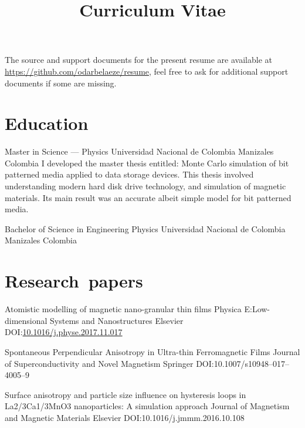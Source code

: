 \documentclass[12pt,english]{moderncv}
\title{Curriculum Vitae}
\begin{document}
\maketitle

\begin{centering}
    The source and support documents for the present resume are available at
    \url{https://github.com/odarbelaeze/resume}, feel free to ask for
    additional support documents if some are missing.
\end{centering}


\section{Education}

        {Master in Science --- Physics}
        {Universidad Nacional de Colombia}
        {Manizales}
        {Colombia}
        {%
            I developed the master thesis entitled: Monte Carlo simulation of
            bit patterned media applied to data storage devices. This thesis
            involved understanding modern hard disk drive technology, and
            simulation of magnetic materials. Its main result was an accurate
            albeit simple model for bit patterned media.
        }

        {Bachelor of Science in Engineering Physics}
        {Universidad Nacional de Colombia}
        {Manizales}
        {Colombia}
        {}


\section{Research~papers}

        {Atomistic modelling of magnetic nano-granular thin films}
        {Physica E:\@ Low-dimensional Systems and Nanostructures}
        {Elsevier}
        {}
        {DOI:\@ \href{https://doi.org/10.1016/j.physe.2017.11.017}{10.1016/j.physe.2017.11.017}}

        {%
            Spontaneous Perpendicular Anisotropy in Ultra-thin Ferromagnetic
            Films
        }
        {Journal of Superconductivity and Novel Magnetism}
        {Springer}
        {}
        {DOI:\@ 10.1007/s10948--017--4005--9}

        {%
            Surface anisotropy and particle size influence on hysteresis loops
            in La2/3Ca1/3MnO3 nanoparticles: A simulation approach
        }
        {Journal of Magnetism and Magnetic Materials}
        {Elsevier}
        {}
        {DOI:\@ 10.1016/j.jmmm.2016.10.108}
\end{document}
